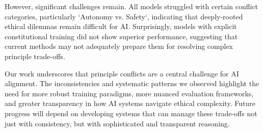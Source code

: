 \documentclass[11pt,a4paper]{article}
\begin{document}
However, significant challenges remain. All models struggled with certain conflict categories, particularly `Autonomy vs. Safety`, indicating that deeply-rooted ethical dilemmas remain difficult for AI. Surprisingly, models with explicit constitutional training did not show superior performance, suggesting that current methods may not adequately prepare them for resolving complex principle trade-offs.

Our work underscores that principle conflicts are a central challenge for AI alignment. The inconsistencies and systematic patterns we observed highlight the need for more robust training paradigms, more nuanced evaluation frameworks, and greater transparency in how AI systems navigate ethical complexity. Future progress will depend on developing systems that can manage these trade-offs not just with consistency, but with sophisticated and transparent reasoning.

\clearpage

\printbibliography
\end{document}
